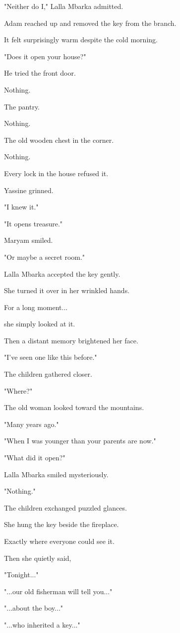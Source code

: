 \documentclass[12pt,openany]{book}
\begin{document}
"Neither do I," Lalla Mbarka admitted.

Adam reached up and removed the key from the branch.

It felt surprisingly warm despite the cold morning.

"Does it open your house?"

He tried the front door.

Nothing.

The pantry.

Nothing.

The old wooden chest in the corner.

Nothing.

Every lock in the house refused it.

Yassine grinned.

"I knew it."

"It opens treasure."

Maryam smiled.

"Or maybe a secret room."

Lalla Mbarka accepted the key gently.

She turned it over in her wrinkled hands.

For a long moment...

she simply looked at it.

Then a distant memory brightened her face.

"I've seen one like this before."

The children gathered closer.

"Where?"

The old woman looked toward the mountains.

"Many years ago."

"When I was younger than your parents are now."

"What did it open?"

Lalla Mbarka smiled mysteriously.

"Nothing."

The children exchanged puzzled glances.

She hung the key beside the fireplace.

Exactly where everyone could see it.

Then she quietly said,

"Tonight..."

"...our old fisherman will tell you..."

"...about the boy..."

"...who inherited a key..."
\end{document}

